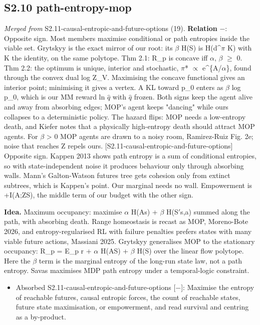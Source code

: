 \documentclass[10pt]{article}
\begin{document}
\subsection{S2.10 path-entropy-mop}\label{node:S2-S2-10-path-entropy-mop}
\textit{Merged from} S2.11-causal-entropic-and-future-options (19). \textbf{Relation} $-$: Opposite sign. Most members maximise conditional or path entropies inside the viable set. Grytskyy is the exact mirror of our root: its \ensuremath{\beta} H(S) is H(d\^{}\ensuremath{\pi} K) with K the identity, on the same polytope. Thm 2.1: R\_p is concave iff \ensuremath{\alpha}, \ensuremath{\beta} \ensuremath{\geq} 0. Thm 2.2: the optimum is unique, interior and stochastic, \ensuremath{\pi}* \ensuremath{\propto} e\^{}\{A/\ensuremath{\alpha}\}, found through the convex dual log Z\_V. Maximising the concave functional gives an interior point; minimising it gives a vertex. A KL toward p\_0 enters as \ensuremath{\beta} log p\_0, which is our MM reward ln \ensuremath{\hat{q}} with \ensuremath{\hat{q}} frozen. Both signs keep the agent alive and away from absorbing edges; MOP's agent keeps "dancing" while ours collapses to a deterministic policy. The hazard flips: MOP needs a low-entropy death, and Kiefer notes that a physically high-entropy death should attract MOP agents. For \ensuremath{\beta} \textgreater{} 0 MOP agents are drawn to a noisy room, Ramirez-Ruiz Fig. 2e; noise that reaches Z repels ours. [S2.11-causal-entropic-and-future-options] Opposite sign. Kappen 2013 shows path entropy is a sum of conditional entropies, so with state-independent noise it produces behaviour only through absorbing walls. Mann's Galton-Watson futures tree gets cohesion only from extinct subtrees, which is Kappen's point. Our marginal needs no wall. Empowerment is +I(A;Z\textbar{}S), the middle term of our budget with the other sign.

\textbf{Idea.} Maximum occupancy: maximise \ensuremath{\alpha} H(A\textbar{}s) + \ensuremath{\beta} H(S\ensuremath{'}\textbar{}s,a) summed along the path, with absorbing death. Range homeostasis is recast as MOP, Moreno-Bote 2026, and entropy-regularised RL with failure penalties prefers states with many viable future actions, Massiani 2025. Grytskyy generalises MOP to the stationary occupancy: R\_p = E\_p r + \ensuremath{\alpha} H(A\textbar{}S) + \ensuremath{\beta} H(S) over the linear flow polytope. Here the \ensuremath{\beta} term is the marginal entropy of the long-run state law, not a path entropy. Savas maximises MDP path entropy under a temporal-logic constraint.
\begin{itemize}[nosep,leftmargin=1.2em]
\item Absorbed S2.11-causal-entropic-and-future-options [\ensuremath{-}]: Maximise the entropy of reachable futures, causal entropic forces, the count of reachable states, future state maximisation, or empowerment, and read survival and centring as a by-product.
\end{itemize}
\end{document}
